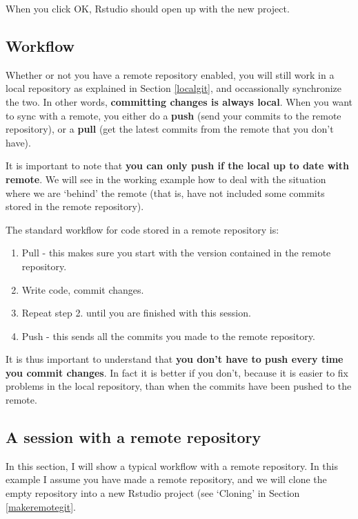 \documentclass[]{book}
\providecommand{\tightlist}{%
  \setlength{\itemsep}{0pt}\setlength{\parskip}{0pt}}
\begin{document}
When you click OK, Rstudio should open up with the new project.

\hypertarget{gitremoteworkflow}{%
\subsection{Workflow}\label{gitremoteworkflow}}

Whether or not you have a remote repository enabled, you will still work in a local repository as explained in Section \ref{localgit}, and occassionally synchronize the two. In other words, \textbf{committing changes is always local}. When you want to sync with a remote, you either do a \textbf{push} (send your commits to the remote repository), or a \textbf{pull} (get the latest commits from the remote that you don't have).

It is important to note that \textbf{you can only push if the local up to date with remote}. We will see in the working example how to deal with the situation where we are `behind' the remote (that is, have not included some commits stored in the remote repository).

The standard workflow for code stored in a remote repository is:

\begin{enumerate}
\def\labelenumi{\arabic{enumi}.}
\tightlist
\item
  Pull - this makes sure you start with the version contained in the remote repository.
\item
  Write code, commit changes.
\item
  Repeat step 2. until you are finished with this session.
\item
  Push - this sends all the commits you made to the remote repository.
\end{enumerate}

It is thus important to understand that \textbf{you don't have to push every time you commit changes}. In fact it is better if you don't, because it is easier to fix problems in the local repository, than when the commits have been pushed to the remote.

\hypertarget{a-session-with-a-remote-repository}{%
\subsection{A session with a remote repository}\label{a-session-with-a-remote-repository}}

In this section, I will show a typical workflow with a remote repository. In this example I assume you have made a remote repository, and we will clone the empty repository into a new Rstudio project (see `Cloning' in Section \ref{makeremotegit}.
\end{document}
